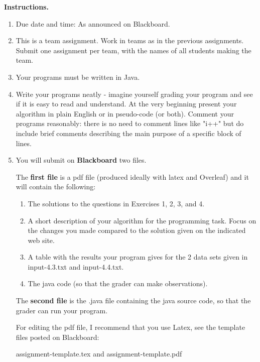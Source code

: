 \documentclass[11pt]{article}
\begin{document}
\textbf{Instructions.}
\begin{enumerate}
\item Due date and  time: As announced on Blackboard.
\item This is a team assignment. Work in teams as in the previous assignments.  Submit one assignment per team, with the names of all students making the team.
\item Your programs must be written in Java.
\item Write your programs neatly - imagine yourself grading your program and see if it is easy to read and understand. 
At the very beginning present your algorithm in plain English or in pseudo-code (or both).
Comment your programs reasonably: there is no need to comment lines like "i++" but do include brief comments describing the main purpose of a specific block of lines.

\item  You will submit on \textbf{Blackboard} two files.  

The \textbf{first file} is a pdf file (produced ideally with latex and Overleaf) and it will contain the following:
\begin{enumerate}
\item The solutions to the questions in Exercises 1, 2, 3, and 4.
\item   A short description of your algorithm for the programming task. Focus on the changes you made compared to the solution given on the indicated web site.
\item   A table with the results your program gives  for the 2 data sets given in input-4.3.txt and input-4.4.txt. 
\item   The java code (so that the grader can make observations).
\end{enumerate}


The \textbf{second file} is the .java file containing the java source code, so that the grader can run your program. 

For editing the pdf file, I recommend that you use Latex, see the template files  posted on Blackboard:
 
           assignment-template.tex 	and  assignment-template.pdf

\end{enumerate}
\newpage
\fi
\end{document}

